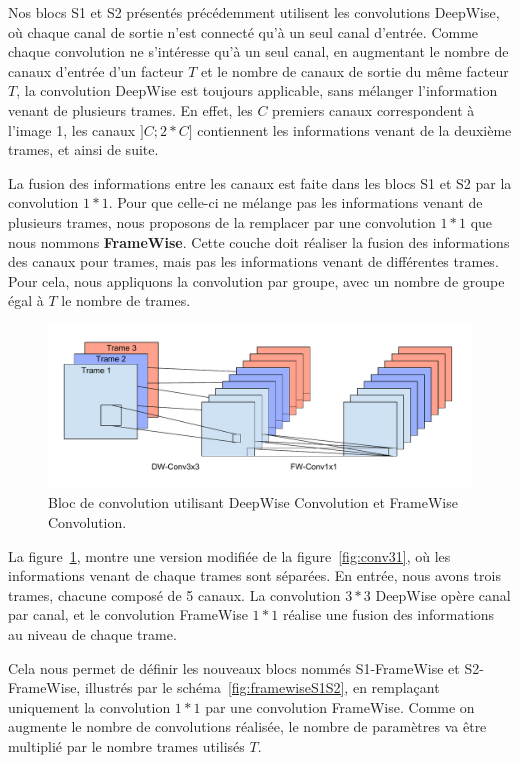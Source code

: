 Nos blocs S1 et S2 présentés précédemment utilisent les convolutions DeepWise, où chaque canal de sortie n'est connecté qu'à un seul canal d'entrée.
Comme chaque convolution ne s'intéresse qu'à un seul canal, en augmentant le nombre de canaux d'entrée d'un facteur $T$ et le nombre de canaux de sortie du même facteur $T$, la convolution DeepWise est toujours applicable, sans mélanger l'information venant de plusieurs trames. 
En effet, les $C$ premiers canaux correspondent à l'image 1, les canaux $] C; 2*C ]$ contiennent les informations venant de la deuxième trames, et ainsi de suite.

La fusion des informations entre les canaux est faite dans les blocs S1 et S2 par la convolution $1*1$.
Pour que celle-ci ne mélange pas les informations venant de plusieurs trames, nous proposons de la remplacer par une convolution $1*1$ que nous nommons \textbf{FrameWise}.
Cette couche doit réaliser la fusion des informations des canaux pour trames, mais pas les informations venant de différentes trames.
Pour cela, nous appliquons la convolution par groupe, avec un nombre de groupe égal à $T$ le nombre de trames.

\begin{figure}%
\centering
\includegraphics[width=\columnwidth]{figures/framewise2.pdf}%
\caption{Bloc de convolution utilisant DeepWise Convolution et FrameWise Convolution.}%
\label{fig:framewiseconv}%
\end{figure}

La figure~\ref{fig:framewiseconv}, montre une version modifiée de la figure~\ref{fig:conv31}, où les informations venant de chaque trames sont séparées.
En entrée, nous avons trois trames, chacune composé de 5 canaux.
La convolution $3*3$ DeepWise opère canal par canal, et le convolution FrameWise $1*1$ réalise une fusion des informations au niveau de chaque trame.

Cela nous permet de définir les nouveaux blocs nommés S1-FrameWise et S2-FrameWise, illustrés par le schéma~\ref{fig:framewiseS1S2}, en remplaçant uniquement la convolution $1*1$ par une convolution FrameWise.
Comme on augmente le nombre de convolutions réalisée, le nombre de paramètres va être multiplié par le nombre trames utilisés $T$.

